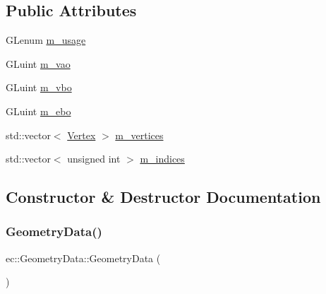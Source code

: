 \subsection*{Public Attributes}
\begin{DoxyCompactItemize}
\item 
G\+Lenum \mbox{\hyperlink{structec_1_1_geometry_data_ab2cb1a359dabc5cad9d41cf0f8121d95}{m\+\_\+usage}}
\item 
G\+Luint \mbox{\hyperlink{structec_1_1_geometry_data_a2d352d0d0b888258b610afa8ceb7b449}{m\+\_\+vao}}
\item 
G\+Luint \mbox{\hyperlink{structec_1_1_geometry_data_aaf6e747c999eee7225183960bb30fc07}{m\+\_\+vbo}}
\item 
G\+Luint \mbox{\hyperlink{structec_1_1_geometry_data_a9a982abc1fed3a4797a5353dec4feb16}{m\+\_\+ebo}}
\item 
std\+::vector$<$ \mbox{\hyperlink{structec_1_1_vertex}{Vertex}} $>$ \mbox{\hyperlink{structec_1_1_geometry_data_ade3f4dd48315b696846bb2c00267394c}{m\+\_\+vertices}}
\item 
std\+::vector$<$ unsigned int $>$ \mbox{\hyperlink{structec_1_1_geometry_data_ab32858fa60eb5c6859c287d00b14357d}{m\+\_\+indices}}
\end{DoxyCompactItemize}


\subsection{Constructor \& Destructor Documentation}
\mbox{\label{structec_1_1_geometry_data_a21db28a4c6d964c8bc59cc698170e77c}} 
\subsubsection{\texorpdfstring{Geometry\+Data()}{GeometryData()}}
{\footnotesize\ttfamily ec\+::\+Geometry\+Data\+::\+Geometry\+Data (\begin{DoxyParamCaption}{ }\end{DoxyParamCaption})}

\mbox{\label{structec_1_1_geometry_data_ab0684d232286015d10fb40ab49836c84}} 
